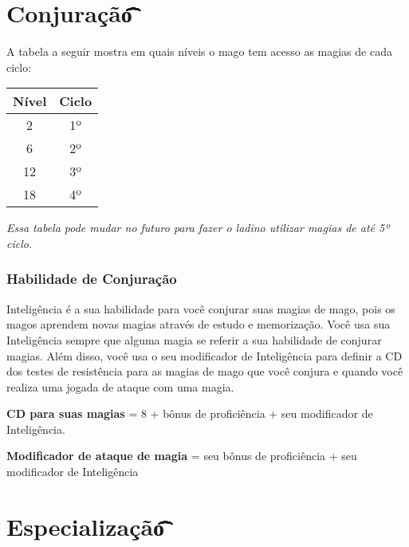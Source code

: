 \documentclass{RPG_Adventure}[2021/10/20]
\begin{document}
\section*{Conjuração\t\t\t\t\t\t\t\t\t\t\t}%
\label{sec:conjuracao}

A tabela a seguir mostra em quais níveis o mago tem acesso as magias de cada
ciclo:

\begin{center}
\begin{tabular}{|||c||c|||}
    \hline
    \textbf{Nível} & \textbf{Ciclo} \\
    \hline
    2 & 1º \\
    \hline
    6 & 2º \\
    \hline
    12 & 3º \\
    \hline
    18 & 4º \\
    \hline
\end{tabular}
\end{center}

\begin{obs}
\textit{Essa tabela pode mudar no futuro para fazer o ladino utilizar magias
de até 5º ciclo}.
\end{obs}

\subsubsection*{Habilidade de Conjuração}%
\label{ssub:habilidade_de_conjuracao}

Inteligência é a sua habilidade para você conjurar suas magias de mago, pois os
magos aprendem novas magias através de estudo e memorização. Você usa sua
Inteligência sempre que alguma magia se referir a sua habilidade de conjurar
magias. Além disso, você usa o seu modificador de Inteligência para definir a CD
dos testes de resistência para as magias de mago que você conjura e quando você
realiza uma jogada de ataque com uma magia.

\begin{center}
\textbf{CD para suas magias} = 8 + bônus de proficiência + seu modificador de
Inteligência. \nl

\textbf{Modificador de ataque de magia} = seu bônus de proficiência + seu
modificador de Inteligência
\end{center}

\section*{Especialização\t\t\t\t\t\t\t\t\t}%
\label{sec:especializacaottttttttt}
\end{document}
